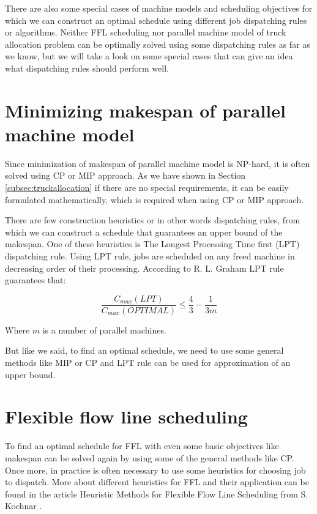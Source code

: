 \documentclass{ctuthesis}
\begin{document}
There are also some special cases of machine models and scheduling objectives for which we can construct an optimal schedule using different job dispatching rules or algorithms. Neither FFL scheduling nor parallel machine model of truck allocation problem can be optimally solved using some dispatching rules as far as we know, but we will take a look on some special cases that can give an idea what dispatching rules should perform well.


\section{Minimizing makespan of parallel machine model}

Since minimization of makespan of parallel machine model is NP-hard, it is often solved using CP or MIP approach. As we have shown in Section \ref{subsec:truckallocation} if there are no special requirements, it can be easily formulated mathematically, which is required when using CP or MIP approach. 

There are few construction heuristics or in other words dispatching rules, from which we can construct a schedule that guarantees an upper bound of the makespan. One of these heuristics is The Longest Processing Time first (LPT) dispatching rule. Using LPT rule, jobs are scheduled on any freed machine in decreasing order of their processing.
According to R. L. Graham \cite{gram1969} LPT rule guarantees that:

\begin{equation}
\dfrac{C_{max}(LPT)}{C_{max}(OPTIMAL)} \leq \dfrac{4}{3} - \dfrac{1}{3m}
\end{equation}

Where $m$ is a number of parallel machines.

But like we said, to find an optimal schedule, we need to use some general methods like MIP or CP and LPT rule can be used for approximation of an upper bound.

\section{Flexible flow line scheduling}
\label{subsec:ffl}
To find an optimal schedule for FFL with even some basic objectives like makespan can be solved again by using some of the general methods like CP. Once more, in practice is often necessary to use some heuristics for choosing job to dispatch. More about different heuristics for FFL and their application can be found in the article Heuristic Methods for Flexible Flow Line Scheduling from S. Kochnar \cite{FFLL}.
\end{document}
